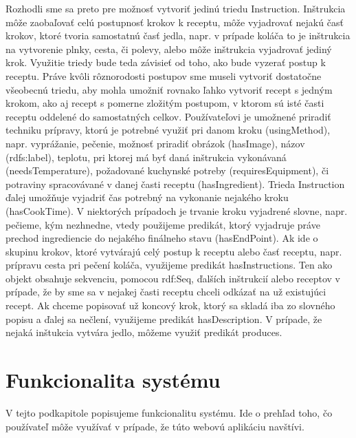 	Rozhodli sme sa preto pre možnosť vytvoriť jedinú triedu Instruction. Inštrukcia môže zaobaľovať celú postupnosť krokov k receptu, môže vyjadrovať nejakú časť krokov, ktoré tvoria samostatnú časť jedla, napr. v prípade koláča to je inštrukcia na vytvorenie plnky, cesta, či polevy, alebo môže inštrukcia vyjadrovať jediný krok. Využitie triedy bude teda závisieť od toho, ako bude vyzerať postup k receptu. Práve kvôli rôznorodosti postupov sme museli vytvoriť dostatočne všeobecnú triedu, aby mohla umožniť rovnako ľahko vytvoriť recept s jedným krokom, ako aj recept s pomerne zložitým postupom, v ktorom sú isté časti receptu oddelené do samostatných celkov. Používateľovi je umožnené priradiť techniku prípravy, ktorú je potrebné využiť pri danom kroku (usingMethod), napr. vyprážanie, pečenie, možnosť priradiť obrázok (hasImage), názov (rdfs:label), teplotu, pri ktorej má byť daná inštrukcia vykonávaná (needsTemperature), požadované kuchynské potreby (requiresEquipment), či potraviny spracovávané v danej časti receptu (hasIngredient).  Trieda Instruction ďalej umožňuje vyjadriť čas potrebný na vykonanie nejakého kroku (hasCookTime). V niektorých prípadoch je trvanie kroku vyjadrené slovne, napr. pečieme, kým nezhnedne, vtedy použijeme predikát, ktorý vyjadruje práve prechod ingrediencie do nejakého finálneho stavu (hasEndPoint). Ak ide o skupinu krokov, ktoré vytvárajú celý postup k receptu alebo časť receptu, napr. prípravu cesta pri pečení koláča, využijeme predikát hasInstructions. Ten ako objekt obsahuje sekvenciu, pomocou rdf:Seq, ďalších inštrukcií alebo receptov v prípade, že by sme sa v nejakej časti receptu chceli odkázať na už existujúci recept. Ak chceme popisovať už koncový krok, ktorý sa skladá iba zo slovného popisu a ďalej sa nečlení, využijeme predikát hasDescription. V prípade, že nejaká inštukcia vytvára jedlo, môžeme využiť predikát produces.
 
\section{Funkcionalita systému} \label{secFunkcionalitaSystemu}
V tejto podkapitole popisujeme funkcionalitu systému. Ide o prehľad toho, čo používateľ môže využívať v prípade, že túto webovú aplikáciu navštívi.

